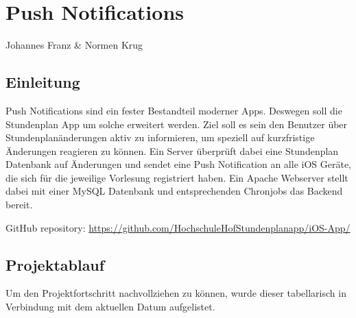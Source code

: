 \chapter{Push Notifications}
Johannes Franz \& Normen Krug

\section{Einleitung}
Push Notifications sind ein fester Bestandteil moderner Apps. Deswegen soll die Stundenplan App um solche erweitert werden. Ziel soll es sein den Benutzer über Stundenplanänderungen aktiv zu informieren, um speziell auf kurzfristige Änderungen reagieren zu können. Ein Server überprüft dabei eine Stundenplan Datenbank auf Änderungen und sendet eine Push Notification an alle iOS Geräte, die sich für die jeweilige Vorlesung registriert haben. Ein Apache Webserver stellt dabei mit einer MySQL Datenbank und entsprechenden Chronjobs das Backend bereit.

GitHub repository: \url{https://github.com/HochschuleHofStundenplanapp/iOS-App/}


\section{Projektablauf}
Um den Projektfortschritt nachvollziehen zu können, wurde dieser tabellarisch in Verbindung mit dem aktuellen Datum aufgelistet.



